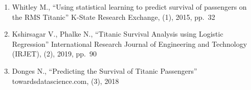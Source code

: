 \documentclass[
]{article}
\begin{document}
\begin{enumerate}
\def\labelenumi{\arabic{enumi}.}
\item
  Whitley M., ``Using statistical learning to predict survival of
  passengers on the RMS Titanic'' K-State Research Exchange, (1), 2015,
  pp.~32
\item
  Kshirsagar V., Phalke N., ``Titanic Survival Analysis using Logistic
  Regression'' International Research Journal of Engineering and
  Technology (IRJET), (2), 2019, pp.~90︎
\item
  Donges N., ``Predicting the Survival of Titanic Passengers''
  towardsdatascience.com, (3), 2018
\end{enumerate}
\end{document}
